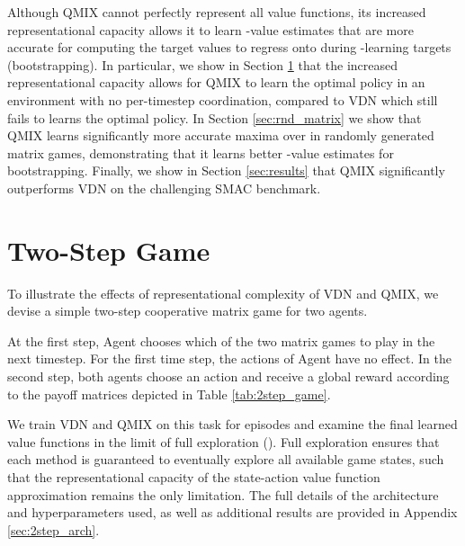 \documentclass[twoside,11pt]{article}
\begin{document}
Although QMIX cannot perfectly represent all value functions, its increased representational capacity allows it to learn -value estimates that are more accurate for computing the target values to regress onto during -learning targets (bootstrapping). 
In particular, we show in Section \ref{sec:two_step_game} that the increased representational capacity allows for QMIX to learn the optimal policy in an environment with no per-timestep coordination, compared to VDN which still fails to learns the optimal policy.
In Section \ref{sec:rnd_matrix} we show that QMIX learns significantly more accurate maxima over  in randomly generated matrix games, demonstrating that it learns better -value estimates for bootstrapping.   
Finally, we show in Section \ref{sec:results} that QMIX significantly outperforms VDN on the challenging SMAC benchmark.

 \section{Two-Step Game}
\label{sec:two_step_game}


To illustrate the effects of representational complexity of VDN and QMIX, we devise a simple two-step cooperative matrix game for two agents. 

At the first step, Agent  chooses which of the two matrix games to play in the next timestep. For the first time step, the actions of Agent  have no effect. In the second step, both agents choose an action and receive a global reward according to the payoff matrices depicted in Table \ref{tab:2step_game}.

We train VDN and QMIX on this task for  episodes and examine the final learned value functions in the limit of full exploration (). Full exploration ensures that each method is guaranteed to eventually explore all available game states, such that the representational capacity of the state-action value function approximation remains the only limitation.
The full details of the architecture and hyperparameters used, as well as additional results are provided in Appendix \ref{sec:2step_arch}.
\end{document}
